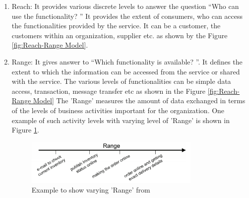\begin{enumerate}
\item Reach: It provides various discrete levels to answer the question “Who can use the functionality? ” It provides the extent of consumers, who can access the functionalities provided by the service. It can be a customer, the customers within an organization, supplier etc. as shown by the Figure \ref{fig:Reach-Range Model}.
\\
\item Range: It gives answer to “Which functionality is available? ”. It defines the extent to which the information can be accessed from the service or shared with the service. The various levels of functionalities can be simple data access, transaction, message transfer etc as shown in the Figure \ref{fig:Reach-Range Model} The 'Range' measures the amount of data exchanged in terms of the levels of business activities important for the organization. One example of such activity levels with varying level of 'Range' is shown in Figure \ref{fig:Range Example}.

\begin{figure}[H]
\begin{center}
\includegraphics[width=0.8\textwidth]{figures/Granularity-R3-two}
\caption{Example to show varying 'Range' from \cite{Keen:2015aa, Weill:1998aa}}
\label{fig:Range Example}
\end{center}
\end{figure}


\end{enumerate}
